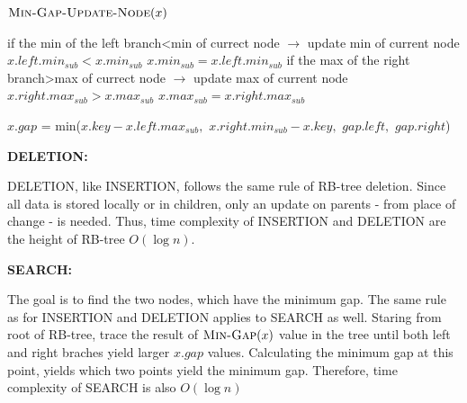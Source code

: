 \documentclass[11pt]{article}
\begin{document}
\begin{enumerate}
\begin{codebox}
		\li $\textnormal{\scshape Min-Gap-Update-Node}(x)$
		
	
		
	\end{codebox}

	
	\begin{codebox}
		
		\li \Comment if the min of the left branch<min of currect node $\rightarrow$ update min of current node
	 	\li \If $x.left.min_{sub} < x.min_{sub}$
		 	\li \Do 
			 	$ x.min_{sub}= x.left.min_{sub}$
			\End
		\li \Comment if the max of the right branch>max of currect node $\rightarrow$ update max of current node
		\li \If $x.right.max_{sub} > x.max_{sub}$
		 	\li \Do 
			 	$ x.max_{sub}= x.right.max_{sub}$
			\End


		\li $x.gap$ = min($x.key-x.left.max_{sub},$ 
		\li \hspace{21mm} $x.right.min_{sub}-x.key,$		 		
		\li \hspace{21mm} $gap.left,$
		\li \hspace{21mm} $gap.right$)	
		
			
	\end{codebox}


\pagebreak
	\textbf{DELETION:}
	
	DELETION, like INSERTION, follows the same rule of RB-tree deletion. Since all data is stored locally or in children, only an update on parents - from place of change - is needed. Thus, time complexity of INSERTION and DELETION are the height of RB-tree $O(\log{n})$. 

	\textbf{SEARCH:}
	
	The goal is to find the two nodes, which have the minimum gap. The same rule as for INSERTION and DELETION applies to SEARCH as well. Staring from root of RB-tree, trace the result of $\textnormal{\scshape Min-Gap}(x)$ value in the tree until both left and right braches yield larger $x.gap$ values. Calculating the minimum gap at this point, yields which two points yield the minimum gap. Therefore, time complexity of SEARCH is also $O(\log{n})$       

	









	
	
	
	
	
	





































   
\end{enumerate}
\end{document}
